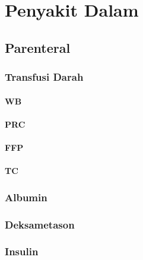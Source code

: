 \documentclass[
]{book}
\begin{document}
\hypertarget{penyakit-dalam-2}{%
\section{Penyakit Dalam}\label{penyakit-dalam-2}}

\hypertarget{parenteral}{%
\subsection{Parenteral}\label{parenteral}}

\hypertarget{transfusi-darah}{%
\subsubsection{Transfusi Darah}\label{transfusi-darah}}

\hypertarget{wb}{%
\paragraph{WB}\label{wb}}

\hypertarget{prc}{%
\paragraph{PRC}\label{prc}}

\hypertarget{ffp}{%
\paragraph{FFP}\label{ffp}}

\hypertarget{tc}{%
\paragraph{TC}\label{tc}}

\hypertarget{albumin}{%
\subsubsection{Albumin}\label{albumin}}

\hypertarget{deksametason}{%
\subsubsection{Deksametason}\label{deksametason}}

\hypertarget{insulin}{%
\subsubsection{Insulin}\label{insulin}}
\end{document}
